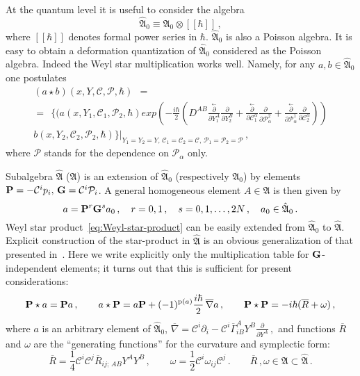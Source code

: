 \documentclass[a4paper,11pt]{amsart}
\numberwithin{thm}{section} %
\numberwithin{equation}{section} %
\numberwithin{figure}{section} %
\def\ih{-i\hbar}
\newcommand{\p}[1]{{\rm p}(#1)}
\renewcommand{\:}{{\rm\, :\,}}
\def\bar{\overline}
\def\tensor{\otimes}
\def\d{\partial}
\newcommand{\dr}[1]{\frac{{\stackrel{\leftarrow}{\d}}}{ \d #1}}
\newcommand{\dl}[1]{\displaystyle\frac{{\d}}{\d #1}}
\def\half{{\frac{1}{2}}}
\def\cP{{\mathcal P}}
\def\cc{{\mathcal C}}
\def\aA{{ \mathfrak A}}
\def\qA{{\hat{\mathfrak A}}}
\def\P{{ \bf P}}
\def\G{{ \bf G}}
\def\con{{\bar\Gamma}}
\def\diff-con{{\bar\nabla}}
\begin{document}
At the quantum level it is useful to consider the algebra
\begin{equation}
 \qA_0\equiv\aA_0\tensor [[\hbar]]\,,
\end{equation}
where $[[\hbar]]$ denotes formal power series in $\hbar$.
$\qA_0$ is also a Poisson algebra.  It is easy to obtain
a deformation quantization of $\qA_0$ considered as the Poisson
algebra.  Indeed the Weyl star multiplication works well.  Namely, for
any $a,b\in \qA_0$ one postulates
\begin{multline}
\label{eq:Weyl-star-product}
(a \star b)(x,Y,\cc,\cP,\hbar)~~=\\
=~~\{(a(x,Y_1,\cc_1,\cP_2,\hbar) exp ( -\frac{i\hbar}{2} (D^{AB}
\dr{Y_1^A} \dl{Y_2^B}+\dr{\cc_1^\alpha}\dl{\cP^2_\alpha}+
\dr{\cP^1_\alpha}\dl{\cc_2^\alpha}))\\
b(x,Y_2,\cc_2,\cP_2,\hbar)\}
{\bigr|}_{Y_1=Y_2=Y,\,\cc_1=\cc_2=\cc,\,\cP_1=\cP_2=\cP} \,,
\end{multline}
where $\cP$ stands for the dependence on $\cP_\alpha$ only.

Subalgebra $\qA$ ($\aA$) is an extension of
$\qA_0$ (respectively $\aA_0$) by
elements $\P=-\cc^i p_i,\,\G=\cc^i \cP_i$.  A general homogeneous
element $A \in \aA$ is then given by
\begin{equation}
a=\P^r \G^s a_0\,, \quad r=0,1\,,
\quad s=0,1,\ldots, 2N\,,
\quad a_0\in \qA_0\,.
\end{equation}
Weyl star product~\eqref{eq:Weyl-star-product} can be easily
extended from $\qA_0$ to $\qA$.  Explicit construction of the
star-product in $\qA$ is an obvious generalization of that presented
in~\cite{[GL]}.  Here we write explicitly only the multiplication
table for $\G$-independent elements; it turns out that this is sufficient 
for present considerations:
\begin{equation}
\label{eq:P-star}
\P\star a=\P a\,,\qquad
a\star \P=a\P + (-1)^{\p{a}}\frac{i\hbar}{2}\,\diff-con a \,, \qquad
 \P\star\P=\ih( {\bar R}+\omega)\,,
\end{equation}
where $a$ is an arbitrary element of $\qA_0$,
$\diff-con=\cc^i\d_i-\cc^i\con^A_{iB}Y^B\dl{Y^A}\,,$ and
functions $\bar R$ and $\omega$ are the ``generating functions'' for the
curvature and symplectic form:
\begin{equation}
\label{eq:R-D-omega}
{\bar R}=\frac{1}{4} \cc^i \cc^j  {\bar R}_{ij;\, A B} Y^A Y^B \,,
\qquad
\omega=\half \cc^i \omega_{ij}\cc^j\,.\qquad {\bar R}\,,\omega\in\aA\subset\qA\,.
\end{equation}
\end{document}
